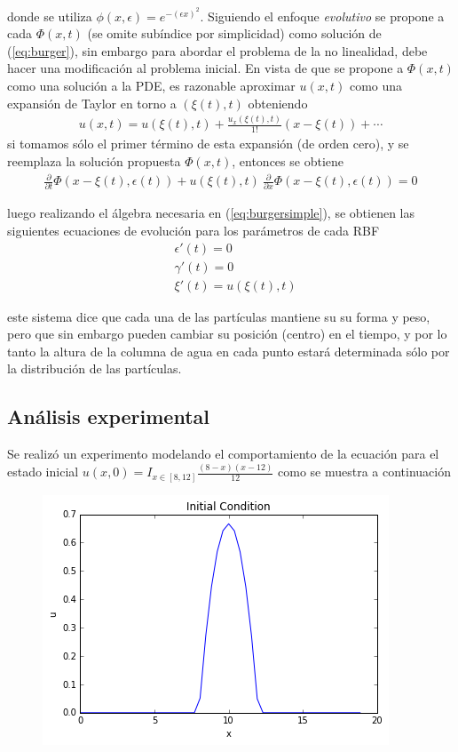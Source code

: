 ﻿\documentclass[spanish]{article}
\begin{document}
    \noindent donde se utiliza $\displaystyle \phi(x,\epsilon) = e^{-(\epsilon x)^2}$. Siguiendo el enfoque \textit{evolutivo} se propone a cada $\Phi(x,t)$ (se omite subíndice por simplicidad) como solución de (\ref{eq:burger}), sin embargo para abordar el problema de la no linealidad, debe hacer una modificación al problema inicial. En vista de que se propone a $\Phi(x,t)$ como una solución a la PDE, es razonable aproximar $u(x,t)$ como una expansión de Taylor en torno a $(\xi(t),t)$ obteniendo
    \begin{align}
      u(x,t) = u(\xi(t),t) + \frac{u_x(\xi(t),t)}{1!}(x-\xi(t)) + \cdots
    \end{align}
    si tomamos sólo el primer término de esta expansión (de orden cero), y  se reemplaza la solución propuesta $\Phi(x,t)$, entonces se obtiene
    \begin{align}
      \frac{\partial}{\partial t}\Phi(x-\xi(t),\epsilon(t)) + u(\xi(t),t)\ \frac{\partial}{\partial x}\Phi(x-\xi(t),\epsilon(t)) = 0
      \label{eq:burgersimple}
    \end{align}

    \noindent luego realizando el álgebra necesaria en (\ref{eq:burgersimple}), se obtienen las siguientes ecuaciones de evolución para los parámetros de cada RBF
    \begin{align*}
    & \epsilon'(t) = 0 \\
    & \gamma'(t) = 0  \\
    & \xi'(t) = u(\xi(t),t)
    \end{align*}
   
    \noindent este sistema dice que cada una de las partículas mantiene su su forma y peso, pero que sin embargo pueden cambiar su posición (centro) en el tiempo, y por lo tanto la altura de la columna de agua en cada punto estará determinada sólo por la distribución de las partículas.


    \subsection{Análisis experimental}
    Se realizó un experimento modelando el comportamiento de la ecuación para el estado inicial $u(x,0) = I_{x \in [8,12]}\frac{(8-x)(x-12)}{12}$ como se muestra a continuación

    \begin{figure}[H]
        \centering
        \includegraphics[scale=0.6]{initialu.png}
    \end{figure}
    
\end{document}
